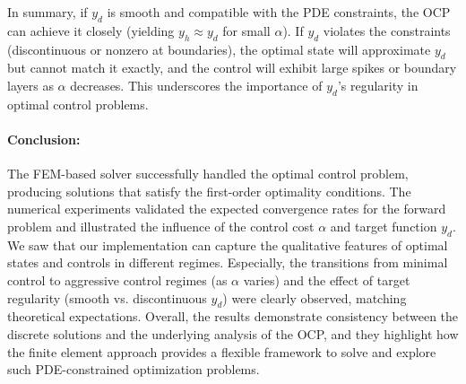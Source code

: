 \documentclass[a4paper,10pt]{article}
\begin{document}
In summary, if $y_d$ is smooth and compatible with the PDE constraints, the OCP can achieve it closely (yielding $y_h \approx y_d$ for small $\alpha$). If $y_d$ violates the constraints (discontinuous or nonzero at boundaries), the optimal state will approximate $y_d$ but cannot match it exactly, and the control will exhibit large spikes or boundary layers as $\alpha$ decreases. This underscores the importance of $y_d$'s regularity in optimal control problems.


\paragraph{Conclusion:}
The FEM-based solver successfully handled the optimal control problem, producing solutions that satisfy the first-order optimality conditions. The numerical experiments validated the expected convergence rates for the forward problem and illustrated the influence of the control cost $\alpha$ and target function $y_d$. We saw that our implementation can capture the qualitative features of optimal states and controls in different regimes. Especially, the transitions from minimal control to aggressive control regimes (as $\alpha$ varies) and the effect of target regularity (smooth vs. discontinuous $y_d$) were clearly observed, matching theoretical expectations. Overall, the results demonstrate consistency between the discrete solutions and the underlying analysis of the OCP, and they highlight how the finite element approach provides a flexible framework to solve and explore such PDE-constrained optimization problems.
\end{document}
